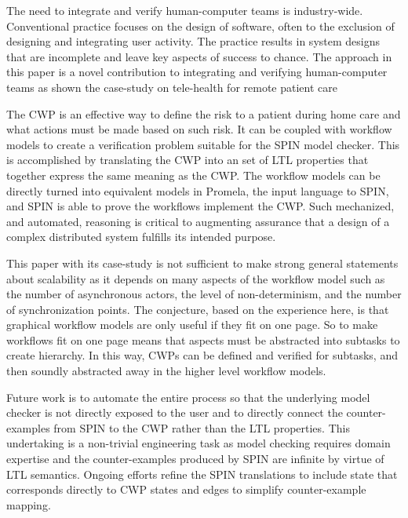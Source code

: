 The need to integrate and verify human-computer teams is industry-wide. Conventional practice focuses on the design of software, often to the exclusion of designing and integrating user activity. The practice results in system designs that are incomplete and leave key aspects of success to chance. The approach in this paper is a novel contribution to integrating and verifying human-computer teams as shown the case-study on tele-health for remote patient care 

The CWP is an effective way to define the risk to a patient during home care and what actions must be made based on such risk. It can be coupled with workflow models to create a verification problem suitable for the SPIN model checker. This is accomplished by translating the CWP into an set of LTL properties that together express the same meaning as the CWP. The workflow models can be directly turned into equivalent models in Promela, the input language to SPIN, and SPIN is able to prove the workflows implement the CWP. Such mechanized, and automated, reasoning is critical to augmenting assurance that a design of a complex distributed system fulfills its intended purpose. 

This paper with its case-study is not sufficient to make strong general statements about scalability as it depends on many aspects of the workflow model such as the number of asynchronous actors, the level of non-determinism, and the number of synchronization points. The conjecture, based on the experience here, is that graphical workflow models are only useful if they fit on one page. So to make workflows fit on one page means that aspects must be abstracted into subtasks to create hierarchy. In this way, CWPs can be defined and verified for subtasks, and then soundly abstracted away in the higher level workflow models. 

Future work is to automate the entire process so that the underlying model checker is not directly exposed to the user and to directly connect the counter-examples from SPIN to the CWP rather than the LTL properties. This undertaking is a non-trivial engineering task as model checking requires domain expertise and the counter-examples produced by SPIN are infinite by virtue of LTL semantics. Ongoing efforts refine the SPIN translations to include state that corresponds directly to CWP states and edges to simplify counter-example mapping.
